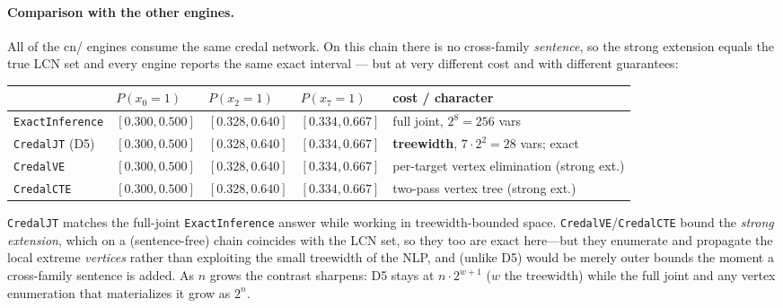 \documentclass[11pt]{article}
\begin{document}
\paragraph{Comparison with the other engines.} All of the cn/ engines consume the same credal
network. On this chain there is no cross-family \emph{sentence}, so the strong extension equals
the true LCN set and every engine reports the same exact interval --- but at very different cost
and with different guarantees:
\begin{center}
\begin{tabular}{lllll}
  \toprule
  & $P(x_0{=}1)$ & $P(x_2{=}1)$ & $P(x_7{=}1)$ & cost / character \\
  \midrule
  \texttt{ExactInference} & $[0.300,0.500]$ & $[0.328,0.640]$ & $[0.334,0.667]$ & full joint, $2^8=256$ vars \\
  \texttt{CredalJT} (D5)  & $[0.300,0.500]$ & $[0.328,0.640]$ & $[0.334,0.667]$ & \textbf{treewidth}, $7{\cdot}2^2=28$ vars; exact \\
  \texttt{CredalVE}       & $[0.300,0.500]$ & $[0.328,0.640]$ & $[0.334,0.667]$ & per-target vertex elimination (strong ext.) \\
  \texttt{CredalCTE}      & $[0.300,0.500]$ & $[0.328,0.640]$ & $[0.334,0.667]$ & two-pass vertex tree (strong ext.) \\
  \bottomrule
\end{tabular}
\end{center}
\texttt{CredalJT} matches the full-joint \texttt{ExactInference} answer while working in
treewidth-bounded space. \texttt{CredalVE}/\texttt{CredalCTE} bound the \emph{strong extension},
which on a (sentence-free) chain coincides with the LCN set, so they too are exact here---but they
enumerate and propagate the local extreme \emph{vertices} rather than exploiting the small
treewidth of the NLP, and (unlike D5) would be merely outer bounds the moment a cross-family
sentence is added. As $n$ grows the contrast sharpens: D5 stays at $n\cdot 2^{w+1}$ ($w$ the
treewidth) while the full joint and any vertex enumeration that materializes it grow as $2^n$.
\end{document}

